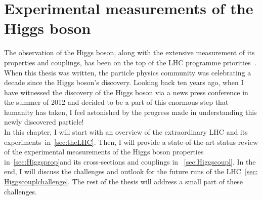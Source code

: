 \chapter{Experimental measurements of the Higgs boson }\label{chap:HiggsConstr}
The observation of the Higgs boson, along with the extensive measurement of its properties and couplings, has been on the top of the LHC programme priorities~\cite{ellis2000physics}. When this thesis was written, the particle physics community was celebrating a decade since the Higgs boson's discovery. Looking back ten years ago, when I have witnessed the discovery of the Higgs boson via a news press conference in the summer of 2012 and decided to be a part of this enormous step that humanity has taken, 
I feel astonished by the progress made in understanding this newly discovered particle!  \\ In this chapter, I will start with an overview of the extraordinary LHC and its experiments~in~\autoref{sec:theLHC}. Then, I will provide a state-of-the-art status review of the experimental measurements of the Higgs boson properties in~\autoref{sec:Higgsprop}and its cross-sections and couplings in ~\autoref{sec:Higgscoupl}. In the end, I will discuss the challenges and outlook for the future runs of the LHC~\autoref{sec: Higgscouplchallenge}. The rest of the thesis will address a small part of these challenges.
